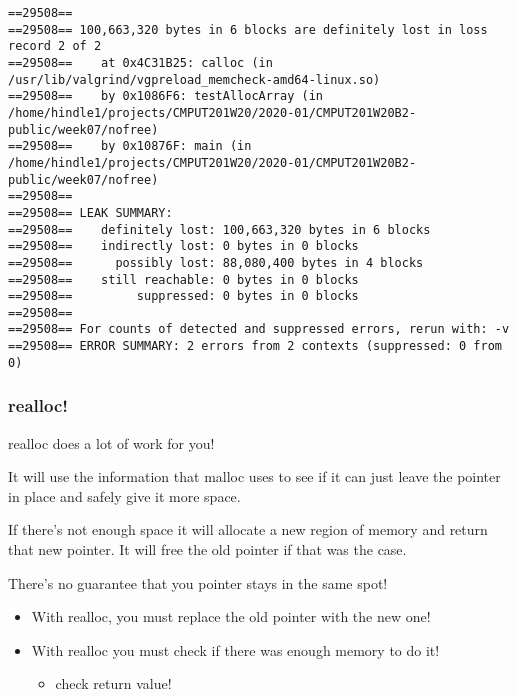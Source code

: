 \documentclass[11pt]{article}
\begin{document}
\begin{verbatim}
==29508== 
==29508== 100,663,320 bytes in 6 blocks are definitely lost in loss record 2 of 2
==29508==    at 0x4C31B25: calloc (in /usr/lib/valgrind/vgpreload_memcheck-amd64-linux.so)
==29508==    by 0x1086F6: testAllocArray (in /home/hindle1/projects/CMPUT201W20/2020-01/CMPUT201W20B2-public/week07/nofree)
==29508==    by 0x10876F: main (in /home/hindle1/projects/CMPUT201W20/2020-01/CMPUT201W20B2-public/week07/nofree)
==29508== 
==29508== LEAK SUMMARY:
==29508==    definitely lost: 100,663,320 bytes in 6 blocks
==29508==    indirectly lost: 0 bytes in 0 blocks
==29508==      possibly lost: 88,080,400 bytes in 4 blocks
==29508==    still reachable: 0 bytes in 0 blocks
==29508==         suppressed: 0 bytes in 0 blocks
==29508== 
==29508== For counts of detected and suppressed errors, rerun with: -v
==29508== ERROR SUMMARY: 2 errors from 2 contexts (suppressed: 0 from 0)
\end{verbatim}

\subsubsection{realloc!}
\label{sec:org55edc0b}

realloc does a lot of work for you!

It will use the information that malloc uses to see if it can just
leave the pointer in place and safely give it more space.

If there's not enough space it will allocate a new region of memory
and return that new pointer. It will free the old pointer if that was
the case.

There's no guarantee that you pointer stays in the same spot!

\begin{itemize}
\item With realloc, you must replace the old pointer with the new one!
\item With realloc you must check if there was enough memory to do it!
\begin{itemize}
\item check return value!
\end{itemize}
\end{itemize}
\end{document}
